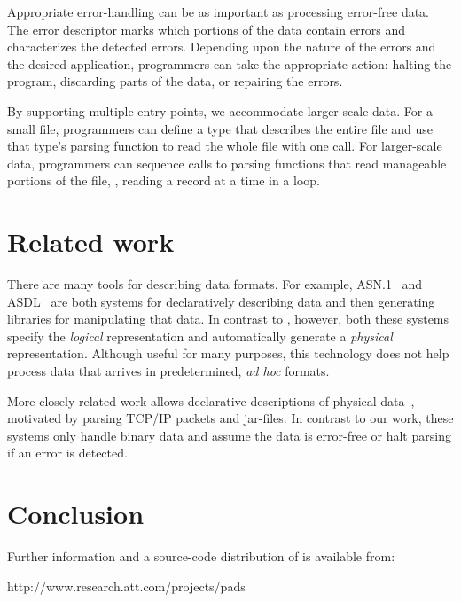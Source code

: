 \documentclass[10pt]{article}
\begin{document}
Appropriate error-handling can be as important as processing
error-free data.  The error descriptor marks which portions of the
data contain errors and characterizes the detected errors.
Depending upon the nature of the errors and the desired application,
programmers can take the appropriate action: halting the program,
discarding parts of the data, or repairing the errors.

By supporting multiple entry-points, we accommodate larger-scale data.
For a small file, programmers can define a \padsl{} type that describes
the entire file and use that type's parsing function to read the whole
file with one call.  For larger-scale data, programmers can sequence
calls to parsing functions that read manageable portions of the file,
\eg{}, reading a record at a time in a loop.

\smallerend{}
\section{Related work}
\smallersp
There are many tools for describing data formats. For example,
\textsc{ASN.1}~\cite{asn} and \textsc{ASDL}~\cite{asdl} are both
systems for declaratively describing data and then generating
libraries for manipulating that data.  In contrast to \pads{},
however, both these systems specify the {\em logical\/} representation
and automatically generate a {\em physical\/} representation.
Although useful for many purposes, this technology does not help
process data that arrives in predetermined, \textit{ad hoc} formats.


More closely related work allows declarative descriptions of physical
data~\cite{sigcomm00,erlang-bit-syntax,gpce02}, motivated by parsing
\textsc{TCP/IP} packets and \java{} jar-files.  In contrast to our
work, these systems only handle binary data and assume the data is
error-free or halt parsing if an error is detected.  

\smallerend{}
\section{Conclusion}
\smallersp
Further information and a source-code distribution of \pads{} is
available from:
\begin{centercode}
http://www.research.att.com/projects/pads
\end{centercode}
 

\end{document}
